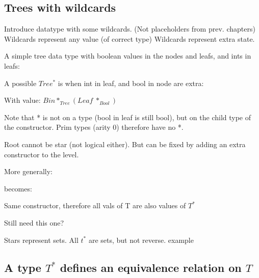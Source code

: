 \subsection{Trees with wildcards}

Introduce datatype with some wildcards. (Not placeholders from prev. chapters) Wildcards represent any value (of correct type) Wildcards represent extra state.


A simple tree data type with boolean values in the nodes and leafs, and ints in leafs:


A possible $Tree^*$ is when int in leaf, and bool in node are extra:


With value: $Bin *_{Tree} (Leaf~*_{Bool})$ 

Note that * is not on a type (bool in leaf is still bool), but on the child type of the constructor. Prim types (arity 0) therefore have no *.

Root cannot be star (not logical either). But can be fixed by adding an extra constructor to the level.

More generally:

becomes:

Same constructor, therefore all vals of T are also values of $T^*$


Still need this one?

Stars represent sets. All $t^*$ are sets, but not reverse. example

 



\subsection{A type $T^*$ defines an equivalence relation on $T$}

